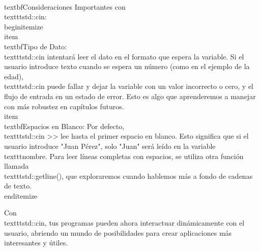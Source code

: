 \\textbf{Consideraciones Importantes con \\texttt{std::cin}:}
\\begin{itemize}
    \\item \\textbf{Tipo de Dato:} \\texttt{std::cin} intentará leer el dato en el formato que espera la variable. Si el usuario introduce texto cuando se espera un número (como en el ejemplo de la edad), \\texttt{std::cin} puede fallar y dejar la variable con un valor incorrecto o cero, y el flujo de entrada en un estado de error. Esto es algo que aprenderemos a manejar con más robustez en capítulos futuros.
    \\item \\textbf{Espacios en Blanco:} Por defecto, \\texttt{std::cin >>} lee hasta el primer espacio en blanco. Esto significa que si el usuario introduce "Juan Pérez", solo "Juan" será leído en la variable \\texttt{nombre}. Para leer líneas completas con espacios, se utiliza otra función llamada \\texttt{std::getline()}, que exploraremos cuando hablemos más a fondo de cadenas de texto.
\\end{itemize}

Con \\texttt{std::cin}, tus programas pueden ahora interactuar dinámicamente con el usuario, abriendo un mundo de posibilidades para crear aplicaciones más interesantes y útiles.